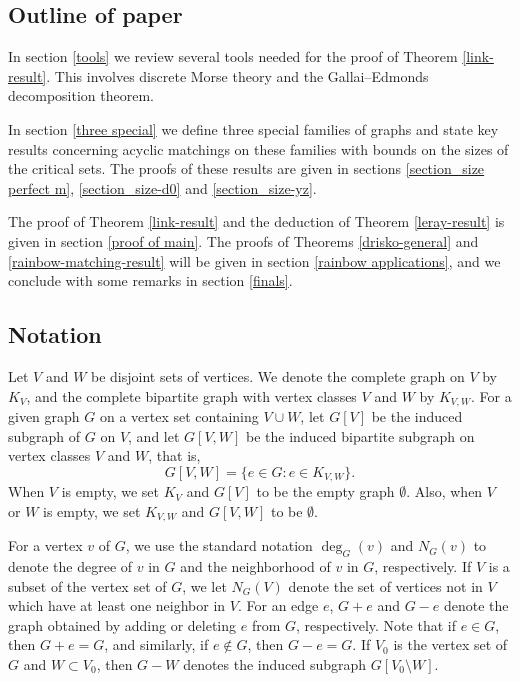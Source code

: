 \documentclass[10pt]{amsart}
\theoremstyle{definition}
\begin{document}
	
	
	\subsection{Outline of paper}
	In section \ref{tools} we review several tools needed for the proof of Theorem \ref{link-result}. This involves discrete Morse theory and the Gallai--Edmonds decomposition theorem. 
	
	In section \ref{three special} we define three special families of graphs and state key results concerning acyclic matchings on these families with bounds on the sizes of the critical sets. The proofs of these results are given in sections \ref{section_size perfect m}, \ref{section_size-d0} and \ref{section_size-yz}.
	
	The proof of Theorem \ref{link-result} and the deduction of Theorem \ref{leray-result} is given in section \ref{proof of main}.
	The proofs of Theorems \ref{drisko-general} and \ref{rainbow-matching-result} will be given in section \ref{rainbow applications}, and we conclude with some remarks in section \ref{finals}.
	
	
	\subsection{Notation}
	Let $V$ and $W$ be disjoint sets of vertices. We denote the complete graph on $V$ by $K_V$, and the complete bipartite graph with vertex classes $V$ and $W$ by $K_{V,W}$. For a given graph $G$ on a vertex set containing $V\cup W$, let $G[V]$ be the induced subgraph of $G$ on $V$, and let $G[V,W]$ be the induced bipartite subgraph on vertex classes $V$ and $W$, that is,
	$$G[V,W]=\{e\in G: e\in K_{V,W} \}. $$
	When $V$ is empty, we set $K_V$ and $G[V]$ to be the empty graph $\emptyset$. Also, when $V$ or $W$ is empty, we set $K_{V,W}$ and $G[V,W]$ to be $\emptyset$.
	
	For a vertex $v$ of $G$, we use the standard notation $\deg_G(v)$ and $N_G(v)$
	to denote the degree of $v$ in $G$ and the neighborhood of $v$ in $G$, respectively. If $V$ is a subset of the vertex set of $G$, we let $N_G(V)$ denote the set of vertices not in $V$ which have at least one neighbor in $V$.
	For an edge $e$,  
	$G+e$ and $G-e$ denote the graph obtained by adding or deleting $e$ from $G$, respectively. Note that if $e \in G$, then $G+e = G$, and similarly, if $e\notin G$, then $G-e = G$. If $V_0$ is the vertex set of $G$ and $W\subset V_0$, then $G-W$ denotes the induced subgraph $G[V_0\setminus W]$.
	
\end{document}
